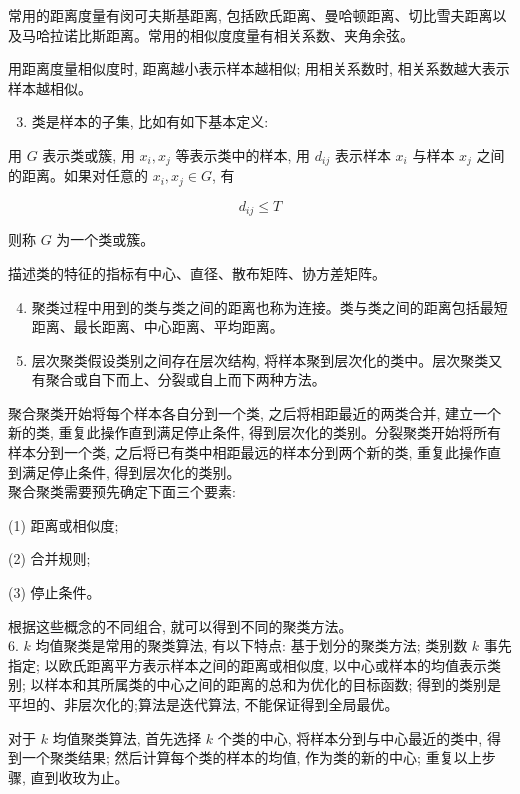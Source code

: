 \documentclass[10pt]{article}
\begin{document}
常用的距离度量有闵可夫斯基距离, 包括欧氏距离、曼哈顿距离、切比雪夫距离以及马哈拉诺比斯距离。常用的相似度度量有相关系数、夹角余弦。

用距离度量相似度时, 距离越小表示样本越相似; 用相关系数时, 相关系数越大表示样本越相似。

\begin{enumerate}
  \setcounter{enumi}{2}
  \item 类是样本的子集, 比如有如下基本定义:
\end{enumerate}

用 $G$ 表示类或簇, 用 $x_{i}, x_{j}$ 等表示类中的样本, 用 $d_{i j}$ 表示样本 $x_{i}$ 与样本 $x_{j}$ 之间的距离。如果对任意的 $x_{i}, x_{j} \in G$, 有

$$
d_{i j} \leqslant T
$$

则称 $G$ 为一个类或簇。

描述类的特征的指标有中心、直径、散布矩阵、协方差矩阵。

\begin{enumerate}
  \setcounter{enumi}{3}
  \item 聚类过程中用到的类与类之间的距离也称为连接。类与类之间的距离包括最短距离、最长距离、中心距离、平均距离。

  \item 层次聚类假设类别之间存在层次结构, 将样本聚到层次化的类中。层次聚类又有聚合或自下而上、分裂或自上而下两种方法。

\end{enumerate}

聚合聚类开始将每个样本各自分到一个类, 之后将相距最近的两类合并, 建立一个新的类, 重复此操作直到满足停止条件, 得到层次化的类别。分裂聚类开始将所有样本分到一个类, 之后将已有类中相距最远的样本分到两个新的类, 重复此操作直到满足停止条件, 得到层次化的类别。\\
聚合聚类需要预先确定下面三个要素:

(1) 距离或相似度;

(2) 合并规则;

(3) 停止条件。

根据这些概念的不同组合, 就可以得到不同的聚类方法。\\
6. $k$ 均值聚类是常用的聚类算法, 有以下特点: 基于划分的聚类方法; 类别数 $k$ 事先指定; 以欧氏距离平方表示样本之间的距离或相似度, 以中心或样本的均值表示类别; 以样本和其所属类的中心之间的距离的总和为优化的目标函数; 得到的类别是平坦的、非层次化的;算法是迭代算法, 不能保证得到全局最优。

对于 $k$ 均值聚类算法, 首先选择 $k$ 个类的中心, 将样本分到与中心最近的类中, 得到一个聚类结果; 然后计算每个类的样本的均值, 作为类的新的中心; 重复以上步骤, 直到收玫为止。
\end{document}
